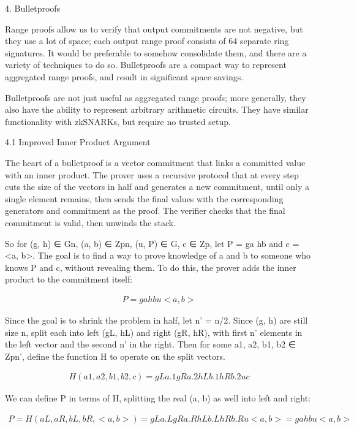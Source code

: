 \documentclass{article}
\begin{document}
4. Bulletproofs

Range proofs allow us to verify that output commitments are not negative, but they use a lot of space; each output range proof consists of 64 separate ring signatures.  It would be preferable to somehow consolidate them, and there are a variety of techniques to do so.  Bulletproofs are a compact way to represent aggregated range proofs, and result in significant space savings.

Bulletproofs are not just useful as aggregated range proofs; more generally, they also have the ability to represent arbitrary arithmetic circuits.  They have similar functionality with zkSNARKs, but require no trusted setup.


4.1 Improved Inner Product Argument

The heart of a bulletproof is a vector commitment that links a committed value with an inner product.  The prover uses a recursive protocol that at every step cuts the size of the vectors in half and generates a new commitment, until only a single element remains, then sends the final values with the corresponding generators and commitment as the proof.  The verifier checks that the final commitment is valid, then unwinds the stack.

So for (g, h) ∈ Gn, (a, b) ∈ Zpn, (u, P) ∈ G, c ∈ Zp, let P = ga hb and c = <a, b>.  The goal is to find a way to prove knowledge of a and b to someone who knows P and c, without revealing them.  To do this, the prover adds the inner product to the commitment itself:

\begin{eqnarray}
  P = ga hb u<a, b>
\end{eqnarray}

Since the goal is to shrink the problem in half, let n’ = n/2.  Since (g, h) are still size n, split each into left (gL, hL) and right (gR, hR), with first n’ elements in the left vector and the second n’ in the right.  Then for some a1, a2, b1, b2 ∈ Zpn’, define the function H to operate on the split vectors. 

\begin{eqnarray}
  H(a1, a2, b1, b2, c) = gLa.1 gRa.2 hLb.1 hRb.2 uc
\end{eqnarray}

We can define P in terms of H, splitting the real (a, b) as well into left and right:

\begin{eqnarray}
  P = H(aL, aR, bL, bR, <a, b>) = gLa.L gRa.R hLb.L hRb.R u<a, b> = ga hb u<a, b>
\end{eqnarray}
\end{document}
